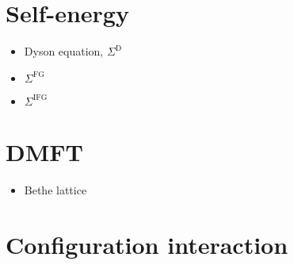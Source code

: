 \section{Self-energy}

\begin{itemize}
    \item Dyson equation, $\Sigma^\mathrm{D}$
    \item $\Sigma^\mathrm{FG}$
    \item $\Sigma^\mathrm{IFG}$
\end{itemize}

\section{DMFT}

\begin{itemize}
    \item Bethe lattice
\end{itemize}

\section{Configuration interaction}
